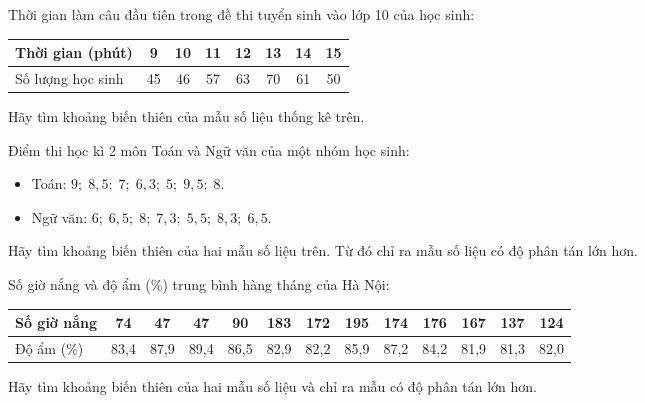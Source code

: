 \begin{bt}
	Thời gian làm câu đầu tiên trong đề thi tuyển sinh vào lớp 10 của học sinh:
	\begin{center}
	\begin{tabular}{|l|c|c|c|c|c|c|c|}
		\hline
		Thời gian (phút) & 9 & 10 & 11 & 12 & 13 & 14 & 15 \\
		\hline
		Số lượng học sinh & 45 & 46 & 57 & 63 & 70 & 61 & 50 \\
		\hline
	\end{tabular}
	\end{center}
	Hãy tìm khoảng biến thiên của mẫu số liệu thống kê trên.
\end{bt}

\begin{bt}
	Điểm thi học kì 2 môn Toán và Ngữ văn của một nhóm học sinh:
	\begin{itemize}
		\item Toán: $9;\; 8{,}5;\; 7;\; 6{,}3;\; 5;\; 9{,}5;\; 8$.
		\item Ngữ văn: $6;\; 6{,}5;\; 8;\; 7{,}3;\; 5{,}5;\; 8{,}3;\; 6{,}5$.
	\end{itemize}
	Hãy tìm khoảng biến thiên của hai mẫu số liệu trên. Từ đó chỉ ra mẫu số liệu có độ phân tán lớn hơn.
\end{bt}

\begin{bt}
	Số giờ nắng và độ ẩm (\%) trung bình hàng tháng của Hà Nội:
	\begin{center}
	\begin{tabular}{|l|c|c|c|c|c|c|c|c|c|c|c|c|}
		\hline
		Số giờ nắng & 74 & 47 & 47 & 90 & 183 & 172 & 195 & 174 & 176 & 167 & 137 & 124 \\
		\hline
		Độ ẩm (\%) & 83,4 & 87,9 & 89,4 & 86,5 & 82,9 & 82,2 & 85,9 & 87,2 & 84,2 & 81,9 & 81,3 & 82,0 \\
		\hline
	\end{tabular}
	\end{center}
	Hãy tìm khoảng biến thiên của hai mẫu số liệu và chỉ ra mẫu có độ phân tán lớn hơn.
\end{bt}

